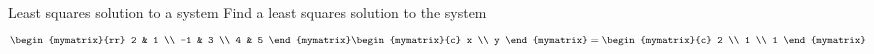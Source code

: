\begin{example}{Least squares solution to a system}{}
Find a least squares solution to the system 
\begin{equation*}
\begin{mymatrix}{rr}
2 & 1 \\ 
-1 & 3 \\ 
4 & 5
\end{mymatrix} \begin{mymatrix}{c}
x \\ 
y
\end{mymatrix} =\begin{mymatrix}{c}
2 \\ 
1 \\ 
1
\end{mymatrix}
\end{equation*}
\end{example}

